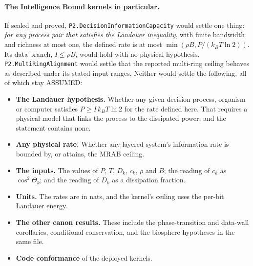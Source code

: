 \documentclass[11pt]{article}
\theoremstyle{definition}
\theoremstyle{remark}
\begin{document}
\paragraph{The Intelligence Bound kernels in particular.} If sealed and proved, \texttt{P2.DecisionInformationCapacity} would
settle one thing: \emph{for any process pair that satisfies the Landauer inequality}, with finite bandwidth and richness at
most one, the defined rate is at most $\min(\rho B, P/(k_BT\ln2))$. Its data branch, $\dot I\le\rho B$, would hold with no
physical hypothesis. \texttt{P2.MultiRingAlignment} would settle that the reported multi-ring ceiling behaves as described
under its stated input ranges. Neither would settle the following, all of which stay ASSUMED:
\begin{itemize}
\item \textbf{The Landauer hypothesis.} Whether any given decision process, organism or computer satisfies
$P\ge\dot I\,k_BT\ln2$ for the rate defined here. That requires a physical model that links the process to the dissipated
power, and the statement contains none.
\item \textbf{Any physical rate.} Whether any layered system's information rate is bounded by, or attains, the MRAB ceiling.
\item \textbf{The inputs.} The values of $P$, $T$, $D_k$, $c_k$, $\rho$ and $B$; the reading of $c_k$ as $\cos^2\Theta_k$; and the
reading of $D_k$ as a dissipation fraction.
\item \textbf{Units.} The rates are in nats, and the kernel's ceiling uses the per-bit Landauer energy.
\item \textbf{The other canon results.} These include the phase-transition and data-wall corollaries, conditional
conservation, and the biosphere hypotheses in the same file.
\item \textbf{Code conformance} of the deployed kernels.
\end{itemize}
\end{document}
